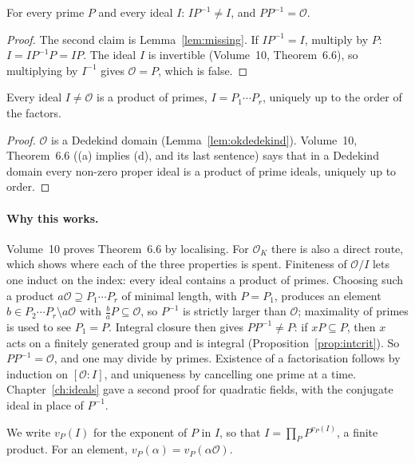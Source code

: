 \begin{proposition}\label{prop:pinv}
For every prime $P$ and every ideal $I$: $IP^{-1}\ne I$, and $PP^{-1}=\mathcal O$.
\end{proposition}
\begin{proof}
The second claim is Lemma~\ref{lem:missing}. If $IP^{-1}=I$, multiply by $P$: $I=IP^{-1}P=IP$. The ideal $I$ is
invertible (Volume~10, Theorem~6.6), so multiplying by $I^{-1}$ gives $\mathcal O=P$, which is false.
\end{proof}

\begin{theorem}[Dedekind]\label{thm:ufi}
Every ideal $I\ne\mathcal O$ is a product of primes, $I=P_1\cdots P_r$, uniquely up to the order of the factors.
\end{theorem}
\begin{proof}
$\mathcal O$ is a Dedekind domain (Lemma~\ref{lem:okdedekind}). Volume~10, Theorem~6.6 ((a) implies (d), and its last
sentence) says that in a Dedekind domain every non-zero proper ideal is a product of prime ideals, uniquely up to order.
\end{proof}

\paragraph{Why this works.}
Volume~10 proves Theorem~6.6 by localising. For $\mathcal O_K$ there is also a direct route, which shows where each of
the three properties is spent. Finiteness of $\mathcal O/I$ lets one induct on the index: every ideal contains a product
of primes. Choosing such a product $a\mathcal O\supseteq P_1\cdots P_r$ of minimal length, with $P=P_1$, produces an
element $b\in P_2\cdots P_r\setminus a\mathcal O$ with $\frac baP\subseteq\mathcal O$, so $P^{-1}$ is strictly larger than
$\mathcal O$; maximality of primes is used to see $P_1=P$. Integral closure then gives $PP^{-1}\ne P$: if $xP\subseteq P$,
then $x$ acts on a finitely generated group and is integral (Proposition~\ref{prop:intcrit}). So $PP^{-1}=\mathcal O$,
and one may divide by primes. Existence of a factorisation follows by induction on $[\mathcal O:I]$, and uniqueness by
cancelling one prime at a time. Chapter~\ref{ch:ideals} gave a second proof for quadratic fields, with the conjugate
ideal in place of $P^{-1}$.

We write $v_P(I)$ for the exponent of $P$ in $I$, so that $I=\prod_PP^{v_P(I)}$, a finite product. For an element,
$v_P(\alpha)=v_P(\alpha\mathcal O)$.

